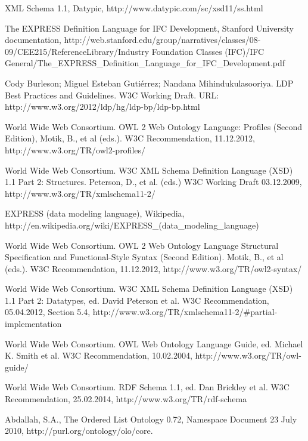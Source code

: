 %
%


\begin{thebibliography}{}

XML Schema 1.1, Datypic, http://www.datypic.com/sc/xsd11/ss.html

The EXPRESS Definition Language for IFC Development, Stanford University documentation,
http://web.stanford.edu/group/narratives/classes/08-09/CEE215/ReferenceLibrary/Industry Foundation Classes (IFC)/IFC General/The\_EXPRESS\_Definition\_Language\_for\_IFC\_Development.pdf

Cody Burleson; Miguel Esteban Gutiérrez; Nandana Mihindukulasooriya. LDP Best Practices and Guidelines. W3C Working Draft. URL: http://www.w3.org/2012/ldp/hg/ldp-bp/ldp-bp.html

World Wide Web Consortium. OWL 2 Web Ontology Language: Profiles (Second Edition), Motik, B., et al (eds.). W3C Recommendation, 11.12.2012, http://www.w3.org/TR/owl2-profiles/

World Wide Web Consortium. W3C XML Schema Definition Language (XSD) 1.1 Part 2: Structures.  Peterson, D., et al. (eds.) W3C Working Draft 03.12.2009, http://www.w3.org/TR/xmlschema11-2/

EXPRESS (data modeling language), Wikipedia, http://en.wikipedia.org/wiki/EXPRESS\_(data\_modeling\_language)

World Wide Web Consortium. OWL 2 Web Ontology Language 
Structural Specification and Functional-Style Syntax (Second Edition). Motik, B., et al (eds.). W3C Recommendation, 11.12.2012, http://www.w3.org/TR/owl2-syntax/

World Wide Web Consortium. W3C XML Schema Definition Language (XSD) 1.1 Part 2: Datatypes, ed. David Peterson et al. W3C Recommendation, 05.04.2012, Section 5.4, http://www.w3.org/TR/xmlschema11-2/#partial-implementation 

World Wide Web Consortium. OWL Web Ontology Language Guide, ed. Michael K. Smith et al. W3C Recommendation, 10.02.2004, http://www.w3.org/TR/owl-guide/

World Wide Web Consortium. RDF Schema 1.1, ed. Dan Brickley et al. W3C Recommendation, 25.02.2014, http://www.w3.org/TR/rdf-schema

Abdallah, S.A., The Ordered List Ontology 0.72, Namespace Document 23 July 2010, http://purl.org/ontology/olo/core.

\end{thebibliography}
